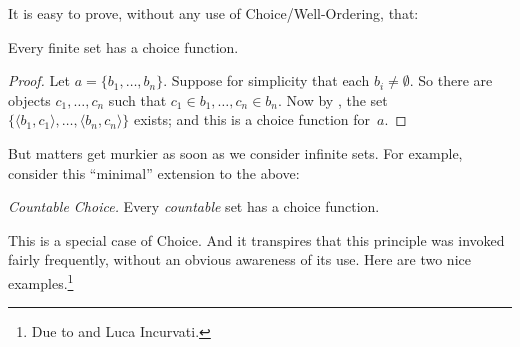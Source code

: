 \documentclass[../../../include/open-logic-section]{subfiles}
\begin{document}

It is easy to prove, without any use of Choice/Well-Ordering, that:

\begin{lem}[in $\Zminus$]
Every finite set has a choice function. 
\end{lem}

\begin{proof}
Let $a = \{b_1, \ldots, b_n\}$. Suppose for simplicity that each $b_i
\neq \emptyset$. So there are objects $c_1, \ldots, c_n$ such that
$c_1 \in b_1, \ldots, c_n \in b_n$. Now by
, the set $\{\langle b_1,
c_1\rangle , \ldots, \langle b_n, c_n\rangle\}$ exists; and this is a
choice function for~$a$.
\end{proof}

But matters get murkier as soon as we consider infinite sets. For
example, consider this ``minimal'' extension to the above:

\begin{defish}
\emph{Countable Choice.} Every \emph{countable} set has a choice function. 
\end{defish}

This is a special case of Choice. And it transpires that this
principle was invoked fairly frequently, without  an obvious awareness
of its use. Here are two nice examples.\footnote{Due to
\citet[\S9.4]{Potter2004} and Luca Incurvati.}
\end{document}
